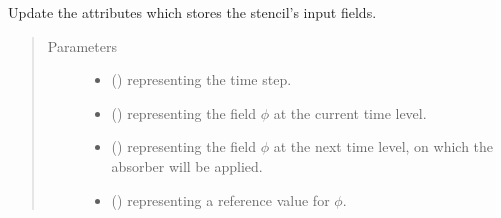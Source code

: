 \documentclass[letterpaper,10pt,english]{sphinxmanual}
\begin{document}
\begin{fulllineitems}
\begin{fulllineitems}
\begin{quote}
\begin{description}
\end{description}\end{quote}

\end{fulllineitems}


\begin{fulllineitems}
\label{\detokenize{api:dycore.vertical_damping.Rayleigh._set_inputs}}
Update the attributes which stores the stencil’s input fields.
\begin{quote}\begin{description}
\item[{Parameters}] \leavevmode\begin{itemize}
\item {} 
 () \textendash{}  representing the time step.

\item {} 
 () \textendash{}  representing the field \(\phi\) at the current time level.

\item {} 
 () \textendash{}  representing the field \(\phi\) at the next time level, on
which the absorber will be applied.

\item {} 
 () \textendash{}  representing a reference value for \(\phi\).

\end{itemize}

\end{description}\end{quote}

\end{fulllineitems}


\end{fulllineitems}
\end{document}
